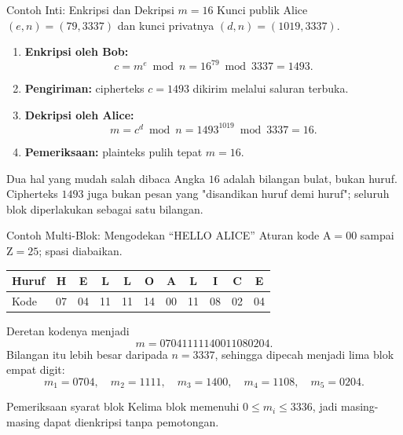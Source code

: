 \documentclass[aspectratio=169,11pt]{beamer}
\begin{document}
\begin{frame}{Contoh Inti: Enkripsi dan Dekripsi $m = 16$}
    \footnotesize
    Kunci publik Alice $(e,n) = (79,3337)$ dan kunci privatnya
    $(d,n) = (1019,3337)$.
    \vspace{0.1cm}
    \begin{enumerate}
        \item \textbf{Enkripsi oleh Bob:}
              \[
                  c = m^{e} \bmod n = 16^{79} \bmod 3337 = 1493 .
              \]
        \item \textbf{Pengiriman:} cipherteks $c = 1493$ dikirim melalui
              saluran terbuka.
        \item \textbf{Dekripsi oleh Alice:}
              \[
                  m = c^{d} \bmod n = 1493^{1019} \bmod 3337 = 16 .
              \]
        \item \textbf{Pemeriksaan:} plainteks pulih tepat $m = 16$.
    \end{enumerate}
    \begin{alertblock}{Dua hal yang mudah salah dibaca}
        \footnotesize
        Angka $16$ adalah bilangan bulat, bukan huruf. Cipherteks $1493$
        juga bukan pesan yang "disandikan huruf demi huruf"; seluruh blok
        diperlakukan sebagai satu bilangan.
    \end{alertblock}
\end{frame}

\begin{frame}{Contoh Multi-Blok: Mengodekan ``HELLO ALICE''}
    \footnotesize
    Aturan kode $\text{A}=00$ sampai $\text{Z}=25$; spasi diabaikan.
    \begin{center}
    \begin{tabular}{@{}l*{10}{c}@{}}
        \toprule
        Huruf & H & E & L & L & O & A & L & I & C & E \\
        \midrule
        Kode  & 07 & 04 & 11 & 11 & 14 & 00 & 11 & 08 & 02 & 04 \\
        \bottomrule
    \end{tabular}
    \end{center}
    Deretan kodenya menjadi
    \[
        m = 07041111140011080204 .
    \]
    Bilangan itu lebih besar daripada $n = 3337$, sehingga dipecah menjadi
    lima blok empat digit:
    \[
        m_1 = 0704,\quad m_2 = 1111,\quad m_3 = 1400,\quad
        m_4 = 1108,\quad m_5 = 0204 .
    \]
    \begin{exampleblock}{Pemeriksaan syarat blok}
        \footnotesize
        Kelima blok memenuhi $0 \le m_i \le 3336$, jadi masing-masing dapat
        dienkripsi tanpa pemotongan.
    \end{exampleblock}
\end{frame}
\end{document}
